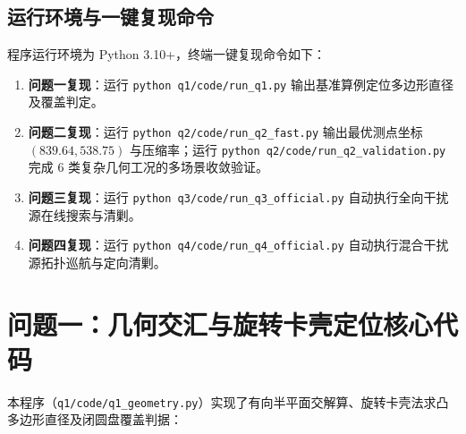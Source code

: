 \subsection{运行环境与一键复现命令}
程序运行环境为 Python 3.10+，终端一键复现命令如下：
\begin{enumerate}[leftmargin=2.2em, itemsep=0.1em]
    \item \textbf{问题一复现}：运行 \texttt{python q1/code/run\_q1.py} 输出基准算例定位多边形直径及覆盖判定。
    \item \textbf{问题二复现}：运行 \texttt{python q2/code/run\_q2\_fast.py} 输出最优测点坐标 $(839.64, 538.75)$ 与压缩率；运行 \texttt{python q2/code/run\_q2\_validation.py} 完成 6 类复杂几何工况的多场景收敛验证。
    \item \textbf{问题三复现}：运行 \texttt{python q3/code/run\_q3\_official.py} 自动执行全向干扰源在线搜索与清剿。
    \item \textbf{问题四复现}：运行 \texttt{python q4/code/run\_q4\_official.py} 自动执行混合干扰源拓扑巡航与定向清剿。
\end{enumerate}

\section{问题一：几何交汇与旋转卡壳定位核心代码}
本程序（\texttt{q1/code/q1\_geometry.py}）实现了有向半平面交解算、旋转卡壳法求凸多边形直径及闭圆盘覆盖判据：


